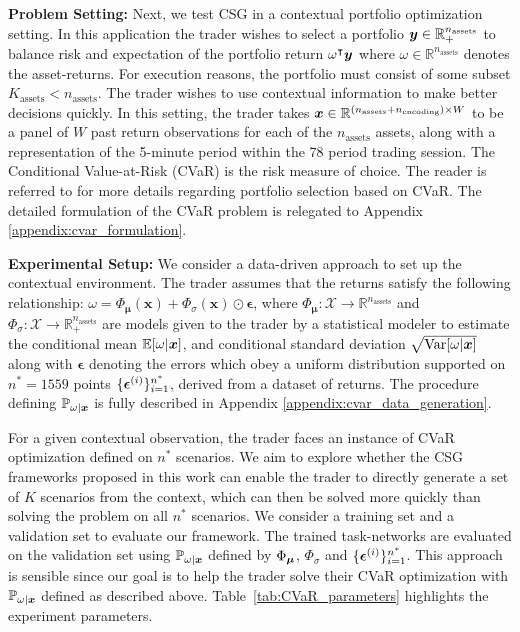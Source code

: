 \textbf{Problem Setting:} Next, we test CSG in a contextual portfolio optimization setting. In this application the trader wishes to select a portfolio $\boldsymbol{y} \in \mathbb{R}_+^{n_{\text{assets}}}$ to balance risk and expectation of the portfolio return $\omega^{\intercal} \boldsymbol{y}$ where $\omega \in \mathbb{R}^{n_{\text{assets}}}$ denotes the asset-returns. For execution reasons, the portfolio must consist of some subset $K_{\text{assets}} < n_{\text{assets}}$. The trader wishes to use contextual information to make better decisions quickly. In this setting, the trader takes $\boldsymbol{x} \in \mathbb{R}^{(n_{\text{assets}} + n_{\text{encoding}}) \times W}$ to be a panel of $W$ past return observations for each of the $n_{\text{assets}}$ assets, along with a representation of the 5-minute period within the 78 period trading session. The Conditional Value-at-Risk (CVaR) is the risk measure of choice. The reader is referred to \citet{krokhmal2002portfolio} for more details regarding portfolio selection based on CVaR. The detailed formulation of the CVaR problem is relegated to Appendix \ref{appendix:cvar_formulation}. 



\vspace{\littlespace}
\noindent \textbf{Experimental Setup:} We consider a data-driven approach to set up the contextual environment. The trader assumes that the returns satisfy the following relationship: $
\omega = \Phi_{\boldsymbol{\mu}}(\boldsymbol{x}) + \Phi_{\sigma} (\boldsymbol{x}) \odot \boldsymbol{\epsilon}$, 
where $\Phi_{\boldsymbol{\mu}} : \mathcal{X} \rightarrow \mathbb{R}^{n_{\text{assets}}}$ and $\Phi_{\sigma} : \mathcal{X} \rightarrow \mathbb{R}_+^{n_{\text{assets}}}$ are models given to the trader by a statistical modeler to estimate the conditional mean $\mathbb{E}[\omega |\boldsymbol{x}]$, and conditional standard deviation $\sqrt{\text{Var}[\omega | \boldsymbol{x}]}$ along with $\boldsymbol{\epsilon}$ denoting the errors which obey a uniform distribution supported on $n^* = 1559$ points $\{\boldsymbol{\epsilon}^{(i)}\}_{i=1}^{n^*}$, derived from a dataset of returns. The procedure defining  $\mathbb{P}_{\omega |\boldsymbol{x}}$ is fully described in Appendix \ref{appendix:cvar_data_generation}.

For a given contextual observation, the trader faces an instance of CVaR optimization defined on $n^*$ scenarios. We aim to explore whether the CSG frameworks proposed in this work can enable the trader to directly generate a set of $K$ scenarios from the context, which can then be solved more quickly than solving the problem on all $n^*$ scenarios. We consider a training set and a validation set to evaluate our framework. The trained task-networks are evaluated on the validation set using $\mathbb{P}_{\omega | \boldsymbol{x}}$ defined by $\Phi_{\boldsymbol{\mu}}$, $\Phi_{\sigma}$ and $\{\boldsymbol{\epsilon}^{(i)}\}_{i=1}^{n^*}$. This approach is sensible since our goal is to help the trader solve their CVaR optimization with $\mathbb{P}_{\omega | \boldsymbol{x}}$ defined as described above. \hbox{Table \ref{tab:CVaR_parameters}} highlights the experiment parameters.


